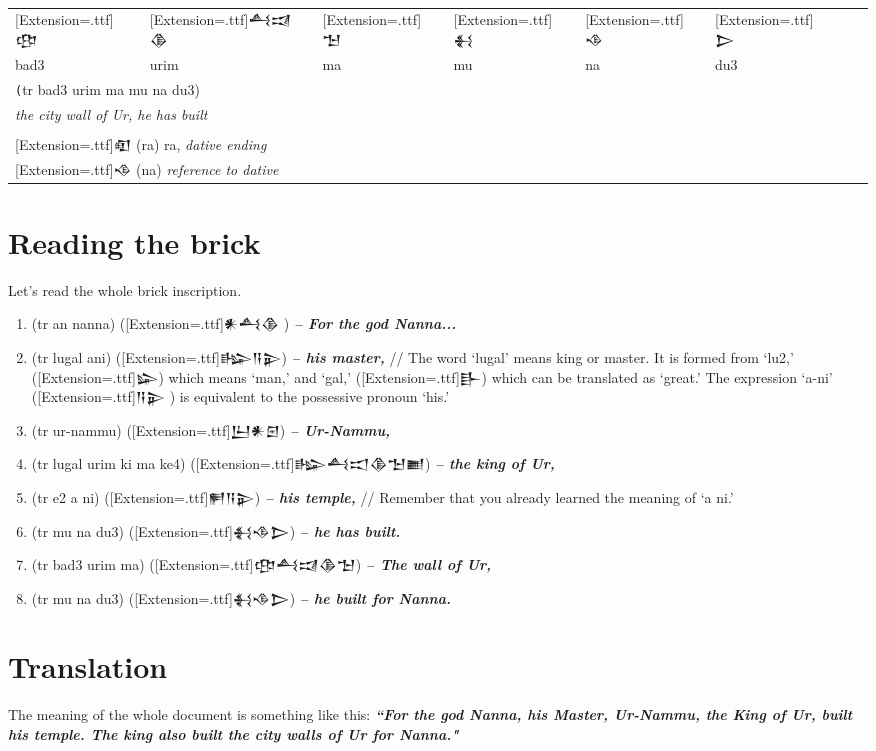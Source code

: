 \documentclass[a4paper,12pt]{book}
\newcommand{\fcn}{\setmainfont{Akkadian}[Extension=.ttf]}
\begin{document}
\verb||\\
\begin{tabular}[!h]{l l l l l l l l}
\fcn\Large 𒂦
&\fcn\Large 𒋀𒀕𒆠 &\fcn\Large 𒈠 &
\fcn\Large 𒈬 & \fcn\Large 𒈾
& \fcn\Large  𒆕\\
  bad3 & urim & ma & mu & na & du3\\
\multicolumn{6}{l}{\texttt (tr bad3 urim ma mu na du3)}\\
\multicolumn{6}{l}{\em the city wall of Ur, he has built}\\
\hline\\
\multicolumn{5}{l}{{\fcn 𒊏}
                    (ra) ra, {\em dative ending}}\\
\multicolumn{5}{l}{{\fcn 𒈾}
                    (na) {\em reference to dative} }\\
\end{tabular} 


\section{Reading the brick}
Let's read the whole brick inscription.

\begin{enumerate}
\item (tr an nanna) ({\fcn 𒀭𒋀𒆠 }) {\bf\em-- For the god Nanna...}
\item (tr lugal ani) ({\fcn 𒈗𒀀𒉌}) {\bf\em -- his master,}
  // The word `lugal' means king or master. It is formed
  from `lu2,' ({\fcn 𒇽}) which means `man,'
  and `gal,' ({\fcn 𒃲}) which can be translated
  as `great.' The expression `a-ni' ({\fcn 𒀀𒉌 })
  is equivalent to the possessive pronoun `his.'
\item (tr ur-nammu) ({\fcn 𒌨𒀭𒇉}) {\bf\em -- Ur-Nammu,}
\item (tr lugal urim ki ma ke4) ({\fcn 𒈗𒋀𒀊𒆠𒈠𒆤})
  {\bf\em -- the king of Ur,}
\item (tr e2 a ni) ({\fcn 𒂍𒀀𒉌}) {\bf\em -- his temple,}
  // Remember that you already learned the
  meaning of `a ni.'
\item (tr mu na du3) ({\fcn 𒈬𒈾𒆕}) {\bf\em -- he has built.}
\item (tr bad3 urim ma) ({\fcn 𒂦𒋀𒀕𒆠𒈠})
  {\bf\em -- The wall of Ur,}
\item (tr mu na du3) ({\fcn 𒈬𒈾𒆕})
  {\bf\em -- he built for Nanna.}
\end{enumerate}

\section{Translation}
The meaning of the whole document is something
like this: {\bf\em``For the god Nanna, his Master,
  Ur-Nammu, the King of Ur, built his temple.
  The king also built the city walls of Ur for Nanna."}
\end{document}
